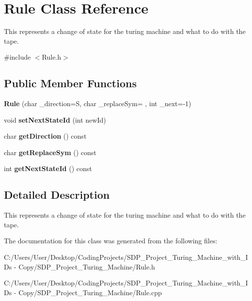 \hypertarget{class_rule}{}\section{Rule Class Reference}
\label{class_rule}


This represents a change of state for the turing machine and what to do with the tape.  




{\ttfamily \#include $<$Rule.\+h$>$}

\subsection*{Public Member Functions}
\begin{DoxyCompactItemize}
\item 
\mbox{\label{class_rule_a5d005aecef42a4213367ba9d17548dcf}} 
{\bfseries Rule} (char \+\_\+direction=\textquotesingle{}S\textquotesingle{}, char \+\_\+replace\+Sym=\textquotesingle{} \textquotesingle{}, int \+\_\+next=-\/1)
\item 
\mbox{\label{class_rule_abd83c6759d08f71ef44f213e7d7cfcc1}} 
void {\bfseries set\+Next\+State\+Id} (int new\+Id)
\item 
\mbox{\label{class_rule_ab98fd5dea8ff76ce19b859023298690b}} 
char {\bfseries get\+Direction} () const
\item 
\mbox{\label{class_rule_ace848ea121a158ba8a13288c3ad7de94}} 
char {\bfseries get\+Replace\+Sym} () const
\item 
\mbox{\label{class_rule_acb03d18e0d8ef61647e915934289386d}} 
int {\bfseries get\+Next\+State\+Id} () const
\end{DoxyCompactItemize}


\subsection{Detailed Description}
This represents a change of state for the turing machine and what to do with the tape. 

The documentation for this class was generated from the following files\+:\begin{DoxyCompactItemize}
\item 
C\+:/\+Users/\+User/\+Desktop/\+Coding\+Projects/\+S\+D\+P\+\_\+\+Project\+\_\+\+Turing\+\_\+\+Machine\+\_\+with\+\_\+\+I\+Ds -\/ Copy/\+S\+D\+P\+\_\+\+Project\+\_\+\+Turing\+\_\+\+Machine/Rule.\+h\item 
C\+:/\+Users/\+User/\+Desktop/\+Coding\+Projects/\+S\+D\+P\+\_\+\+Project\+\_\+\+Turing\+\_\+\+Machine\+\_\+with\+\_\+\+I\+Ds -\/ Copy/\+S\+D\+P\+\_\+\+Project\+\_\+\+Turing\+\_\+\+Machine/Rule.\+cpp\end{DoxyCompactItemize}
